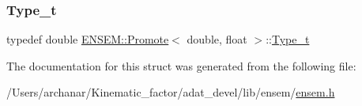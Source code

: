 \subsubsection{\texorpdfstring{Type\_t}{Type\_t}\hspace{0.1cm}{\footnotesize\ttfamily [2/2]}}
{\footnotesize\ttfamily typedef double \mbox{\hyperlink{structENSEM_1_1Promote}{E\+N\+S\+E\+M\+::\+Promote}}$<$ double, float $>$\+::\mbox{\hyperlink{structENSEM_1_1Promote_3_01double_00_01float_01_4_a28b4d03d3f730b8dcd68ae2c895ea119}{Type\+\_\+t}}}



The documentation for this struct was generated from the following file\+:\begin{DoxyCompactItemize}
\item 
/\+Users/archanar/\+Kinematic\+\_\+factor/adat\+\_\+devel/lib/ensem/\mbox{\hyperlink{lib_2ensem_2ensem_8h}{ensem.\+h}}\end{DoxyCompactItemize}
